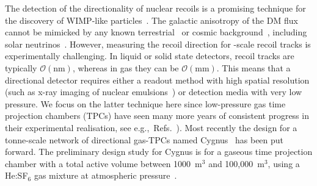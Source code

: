 \documentclass[prd,10pt,twocolumn,showpacs,nofootinbib,aps,superscriptaddress,preprintnumbers]{revtex4-1}
\newcommand{\eV}{\text{e\kern-0.15ex V}\xspace}
\newcommand{\keV}{\text{k\eV}\xspace}
\begin{document}
  
  The detection of the directionality of nuclear recoils is a promising
  technique for the discovery of WIMP-like
  particles~\cite{Mayet:2016zxu}. The galactic anisotropy of the
  DM flux cannot be mimicked by any known
  terrestrial~\cite{Leyton:2017tza} or cosmic
  background~\cite{Mei:2005gm}, including solar
  neutrinos~\cite{O'Hare:2015mda, OHare:2017rag}. 
  However, measuring the recoil
  direction for \keV-scale recoil tracks is experimentally
  challenging. In liquid or solid state detectors, recoil tracks are
  typically $\mathcal{O}(\mathrm{nm})$, whereas in gas they can be
  $\mathcal{O}(\mathrm{mm})$. This means that a directional detector
  requires either a readout method with high spatial resolution
  (such as x-ray imaging of nuclear emulsions~\cite{Aleksandrov:2016fyr,Agafonova:2017ajg}) or detection
  media with very low pressure. We focus on the latter technique here since low-pressure gas time projection chambers (TPCs) have seen many more years of consistent progress in their experimental realisation, see e.g.,~Refs.~\cite{Santos:2011kf,Riffard:2013psa,Nakamura:2015iza,Monroe:2011er,Leyton:2016nit,Daw:2011wq,Battat:2014van,Battat:2016xaw,CYGNO:2019aqp}).
Most recently the design for a tonne-scale network of directional
  gas-TPCs named {\sc Cygnus}~\cite{CYGNUS} has been put forward. The
  preliminary design study for {\sc Cygnus} is for a gaseous time projection
  chamber with a total active volume between 1000~m$^3$ and
  100,000~m$^3$, using a He:SF${_6}$ gas mixture at atmospheric pressure~\cite{CYGNUS}.
\end{document}
